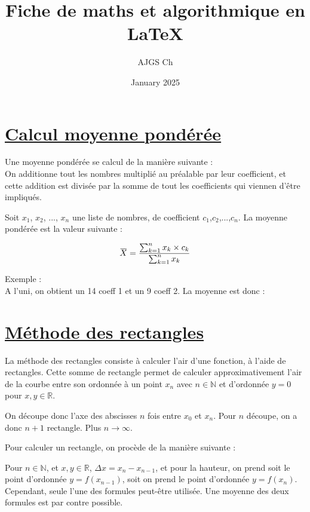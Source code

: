 \documentclass{article}
\title{Fiche de maths et algorithmique en \LaTeX}
\author{AJGS Ch}
\date{January 2025}
\newcommand{\ols}[1]{\mskip.5\thinmuskip\overline{\mskip-.5\thinmuskip {#1} \mskip-.5\thinmuskip}\mskip.5\thinmuskip} %
\begin{document}
\maketitle

\section{\underline{Calcul moyenne pondérée}}

    \noindent Une moyenne pondérée se calcul de la manière suivante :
        \\On additionne tout les nombres multiplié au préalable par leur coefficient, et cette addition est divisée par la somme de tout les coefficients qui viennen d'être impliqués.
        
    \noindent Soit $x_1$, $x_2$, ..., $x_n$ une liste de nombres, de coefficient $c_1$,$c_2$,...,$c_n$. La moyenne pondérée est la valeur suivante :

    \begin{equation*}
        \ols{X} = \frac{\sum_{k=1}^n x_k \times c_k}{\sum_{k=1}^n x_k}
    \end{equation*}
    

    \normalsize \noindent Exemple :
    \\A l'uni, on obtient un 14 coeff 1 et un 9 coeff 2. La moyenne est donc :
    
\section{\underline{Méthode des rectangles}}

    La méthode des rectangles consiste à calculer l'air d'une fonction, à l'aide de rectangles. Cette somme de rectangle permet de calculer approximativement l'air de la courbe entre son ordonnée à un point $x_n$ avec $n \in \mathbb{N} $ et d'ordonnée $y = 0$ pour $x,y \in \mathbb{R}$.

    On découpe donc l'axe des abscisses $n$ fois entre $x_0$ et $x_n$. Pour $n$ découpe, on a donc $n+1$ rectangle. Plus $n \xrightarrow{} \infty$.
    
    Pour calculer un rectangle, on procède de la manière suivante :
    
    Pour $n \in \mathbb{N}$, et $x,y \in \mathbb{R} $, $\Delta x = x_n - x_{n-1}$, et pour la hauteur, on prend soit le point d'ordonnée $y=f(x_{n-1})$, soit on prend le point 
    d'ordonnée $y=f(x_n)$. Cependant, seule l'une des formules peut-être utilisée. Une moyenne des deux formules est par contre possible.
    
\end{document}
